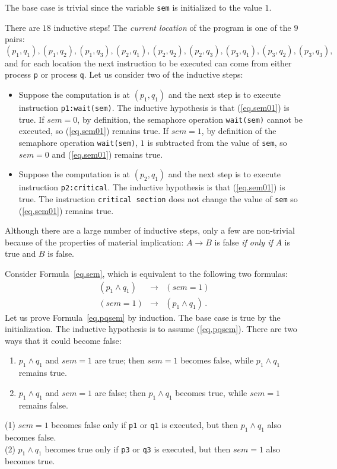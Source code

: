 \documentclass[11pt,a4paper]{report}
\begin{document}
The base case is trivial since the variable \texttt{sem} is initialized to the value $1$.

There are $18$ inductive steps! The \emph{current location} of the program is one of the $9$ pairs:
\[(p_1,q_1), (p_1,q_2), (p_1,q_3), (p_2,q_1), (p_2,q_2), (p_2,q_3), (p_3,q_1), (p_3,q_2), (p_3,q_3),\]
and for each location the next instruction to be executed can come from either process \texttt{p} or process \texttt{q}. Let us consider two of the inductive steps:

\begin{itemize}
\item Suppose the computation is at $(p_1,q_1)$ and the next step is to execute instruction \texttt{p1:wait(sem)}. The inductive hypothesis is that (\ref{eq.sem01}) is true. If $\mathit{sem} = 0$, by definition, the semaphore operation \texttt{wait(sem)} cannot be executed, so (\ref{eq.sem01}) remains true. If $\mathit{sem} = 1$, by definition of the semaphore operation \texttt{wait(sem)}, $1$ is subtracted from the value of \texttt{sem}, so $\mathit{sem} = 0$ and (\ref{eq.sem01}) remains true.
\item Suppose the computation is at $(p_2,q_1)$ and the next step is to execute instruction \texttt{p2:critical}. The inductive hypothesis is that (\ref{eq.sem01}) is true. The instruction \texttt{critical section} does not change the value of \texttt{sem} so (\ref{eq.sem01}) remains true.
\end{itemize}

Although there are a large number of inductive steps, only a few are non-trivial because of the properties of material implication: $A\rightarrow B$ is false \emph{if only if} $A$ is true and $B$ is false.

Consider Formula~\ref{eq.sem}, which is equivalent to the following two formulas:
\begin{eqnarray}
(p_1 \wedge q_1) &\rightarrow& (\mathit{sem} = 1)\label{eq.pqsem}\\
(\mathit{sem} = 1) &\rightarrow& (p_1 \wedge q_1)\label{eq.sempq}\,.
\end{eqnarray}
Let us prove Formula~\ref{eq.pqsem} by induction. The base case is true by the initialization. The inductive hypothesis is to assume (\ref{eq.pqsem}). There are two ways that it could become false:
\begin{enumerate}
\item $p_1 \wedge q_1$ and $\mathit{sem} = 1$ are true; then $\mathit{sem} = 1$ becomes false, while $p_1 \wedge q_1$ remains true.
\item $p_1 \wedge q_1$ and $\mathit{sem} = 1$ are false; then $p_1 \wedge q_1$ becomes true, while $\mathit{sem} = 1$ remains false.
\end{enumerate}
(1) $\mathit{sem} = 1$ becomes false only if \texttt{p1} or \texttt{q1} is executed, but then $p_1 \wedge q_1$ also becomes false.\\
(2) $p_1 \wedge q_1$ becomes true only if \texttt{p3} or \texttt{q3} is executed, but then $\mathit{sem} = 1$ also becomes true.
\end{document}
